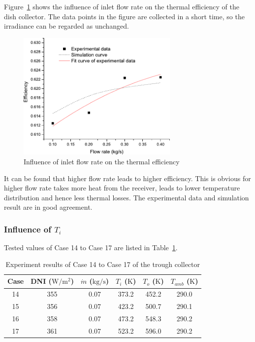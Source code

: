 Figure~\ref{fig:q_m-eta-trough} shows the influence of inlet flow rate on the thermal efficiency of the dish collector. The data points in the figure are collected in a short time, so the irradiance can be regarded as unchanged.
\begin{figure}[!ht]
\centering
\includegraphics[width=0.7\textwidth]{fig/q_m-eta-trough}
\caption{Influence of inlet flow rate on the thermal efficiency}
\label{fig:q_m-eta-trough}
\end{figure}

It can be found that higher flow rate leads to higher efficiency. This is obvious for higher flow rate takes more heat from the receiver, leads to lower temperature distribution and hence less thermal losses. The experimental data and simulation result are in good agreement.

\subsubsection{Influence of $T_i$}
Tested values of Case 14 to Case 17 are listed in Table~\ref{tab:ResultOfDish3}.

\begin{table}[htbp]\footnotesize
	\caption{Experiment results of Case 14 to Case 17 of the trough collector}
	\begin{center}
	\begin{tabular}{cccccc}
		\toprule
		Case	& DNI ($\mathrm{W/m^2}$)	&	$\dot{m}$ ($\mathrm{kg/s}$)			&	$T_i$ ($\mathrm{K}$)	&	$T_o$ ($\mathrm{K}$)		&	$T_{amb}$ ($\mathrm{K}$)\\
		\midrule
		14	&	355	&	0.07	&	373.2	&	452.2	&	290.0\\
		15	&	356	&	0.07	&	423.2	&	500.7	&	290.1\\
		16	&	358	&	0.07	&	473.2	&	548.3	&	290.2	\\
		17	&	361	&	0.07	&	523.2	&	596.0	&	290.2\\
		\bottomrule
	\end{tabular}
	\end{center}
	\label{tab:ResultOfDish3}
\end{table}

